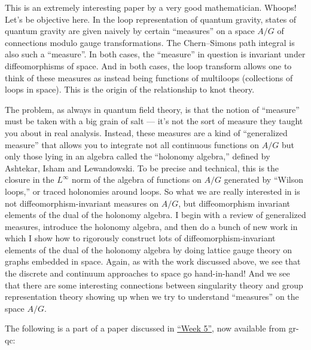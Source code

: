 \documentclass{article}
\def\tightlist{}
\renewcommand{\texttt}[1]{%
  \begingroup
  \ttfamily
  \begingroup\lccode`~=`/\lowercase{\endgroup\def~}{/\discretionary{}{}{}}%
  \begingroup\lccode`~=`[\lowercase{\endgroup\def~}{[\discretionary{}{}{}}%
  \begingroup\lccode`~=`.\lowercase{\endgroup\def~}{.\discretionary{}{}{}}%
  \catcode`/=\active\catcode`[=\active\catcode`.=\active
  \scantokens{#1\noexpand}%
  \endgroup
}
\begin{document}
This is an extremely interesting paper by a very good mathematician.
Whoops! Let's be objective here. In the loop representation of quantum
gravity, states of quantum gravity are given naively by certain
``measures'' on a space \(A/G\) of connections modulo gauge
transformations. The Chern--Simons path integral is also such a
``measure''. In both cases, the ``measure'' in question is invariant
under diffeomorphisms of space. And in both cases, the loop transform
allows one to think of these measures as instead being functions of
multiloops (collections of loops in space). This is the origin of the
relationship to knot theory.

The problem, as always in quantum field theory, is that the notion of
``measure'' must be taken with a big grain of salt --- it's not the sort
of measure they taught you about in real analysis. Instead, these
measures are a kind of ``generalized measure'' that allows you to
integrate not all continuous functions on \(A/G\) but only those lying
in an algebra called the ``holonomy algebra,'' defined by Ashtekar,
Isham and Lewandowski. To be precise and technical, this is the closure
in the \(L^\infty\) norm of the algebra of functions on \(A/G\)
generated by ``Wilson loops,'' or traced holonomies around loops. So
what we are really interested in is not diffeomorphism-invariant
measures on \(A/G\), but diffeomorphism invariant elements of the dual
of the holonomy algebra. I begin with a review of generalized measures,
introduce the holonomy algebra, and then do a bunch of new work in which
I show how to rigorously construct lots of diffeomorphism-invariant
elements of the dual of the holonomy algebra by doing lattice gauge
theory on graphs embedded in space. Again, as with the work discussed
above, we see that the discrete and continuum approaches to space go
hand-in-hand! And we see that there are some interesting connections
between singularity theory and group representation theory showing up
when we try to understand ``measures'' on the space \(A/G\).

The following is a part of a paper discussed in
\protect\hyperlink{week5}{``Week 5''}, now available from gr-qc:

\end{document}
